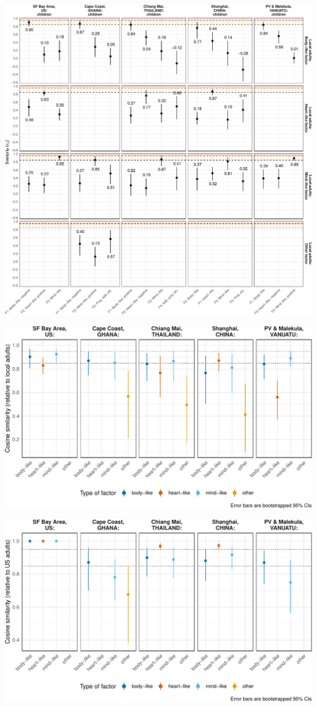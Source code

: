 \documentclass[
  man]{apa6}
\begin{document}
\includegraphics{Script_Re_Weisman_2021_Group1_2024_files/figure-latex/cong cis children b-1.pdf}

\includegraphics{Script_Re_Weisman_2021_Group1_2024_files/figure-latex/alt fig 4-1.pdf}

\includegraphics{Script_Re_Weisman_2021_Group1_2024_files/figure-latex/alt fig 3-1.pdf}
\end{document}
